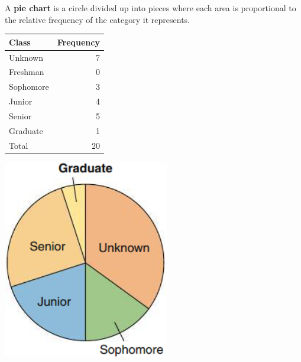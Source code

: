 \documentclass[../mathNotesPreamble]{subfiles}
\begin{document}
  \begin{defn*}
    A \textbf{pie chart} is a circle divided up into pieces where each area is proportional to the relative frequency of the category it represents.
  \end{defn*}
  \begin{ex*}

  \end{ex*}
  \noindent
  \begin{minipage}{0.3\linewidth}
    \begin{center}
      \begin{tabular}{@{}lr@{}}\toprule
        Class& Frequency\\\midrule
        Unknown& 7\\
        Freshman& 0\\
        Sophomore& 3\\
        Junior& 4\\
        Senior& 5\\
        Graduate& 1\\\midrule
        Total& 20\\\bottomrule
      \end{tabular}
    \end{center}
  \end{minipage}%
  \begin{minipage}{0.3\linewidth}
    \includegraphics[width=\linewidth]{images/math211_figure_2p27}
  \end{minipage}



  \pagebreak
\end{document}
